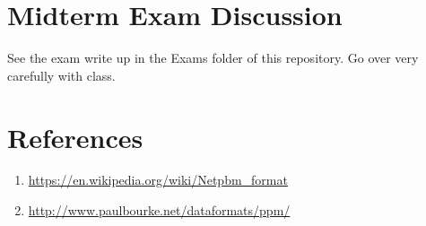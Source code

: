 \documentclass[12pt]{article}
\begin{document}
\section{Midterm Exam Discussion}
See the exam write up in the Exams folder of this repository. Go over very carefully with class.


\section{References}

\begin{enumerate}
	\item \url{https://en.wikipedia.org/wiki/Netpbm_format}
	\item \url{http://www.paulbourke.net/dataformats/ppm/}
\end{enumerate}
\end{document}
